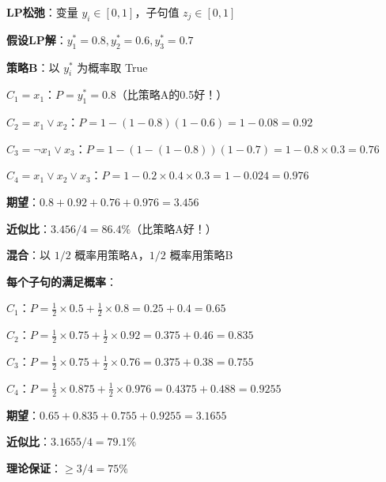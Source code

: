 \documentclass[12pt, a4paper]{ctexart}
\begin{document}
\begin{blackboard}

\textbf{LP松弛}：变量 $y_i \in [0,1]$，子句值 $z_j \in [0,1]$

\textbf{假设LP解}：$y_1^* = 0.8, y_2^* = 0.6, y_3^* = 0.7$

\textbf{策略B}：以 $y_i^*$ 为概率取 True

$C_1 = x_1$：$P = y_1^* = \mathbf{0.8}$（比策略A的0.5好！）

$C_2 = x_1 \lor x_2$：$P = 1 - (1-0.8)(1-0.6) = 1 - 0.08 = \mathbf{0.92}$

$C_3 = \neg x_1 \lor x_3$：$P = 1 - (1-(1-0.8))(1-0.7) = 1 - 0.8 \times 0.3 = \mathbf{0.76}$

$C_4 = x_1 \lor x_2 \lor x_3$：$P = 1 - 0.2 \times 0.4 \times 0.3 = 1 - 0.024 = \mathbf{0.976}$

\textbf{期望}：$0.8 + 0.92 + 0.76 + 0.976 = \mathbf{3.456}$

\textbf{近似比}：$3.456 / 4 = 86.4\%$（比策略A好！）

\end{blackboard}

\begin{blackboard}

\textbf{混合}：以 $1/2$ 概率用策略A，$1/2$ 概率用策略B

\textbf{每个子句的满足概率}：

$C_1$：$P = \frac{1}{2} \times 0.5 + \frac{1}{2} \times 0.8 = 0.25 + 0.4 = \mathbf{0.65}$

$C_2$：$P = \frac{1}{2} \times 0.75 + \frac{1}{2} \times 0.92 = 0.375 + 0.46 = \mathbf{0.835}$

$C_3$：$P = \frac{1}{2} \times 0.75 + \frac{1}{2} \times 0.76 = 0.375 + 0.38 = \mathbf{0.755}$

$C_4$：$P = \frac{1}{2} \times 0.875 + \frac{1}{2} \times 0.976 = 0.4375 + 0.488 = \mathbf{0.9255}$

\textbf{期望}：$0.65 + 0.835 + 0.755 + 0.9255 = \mathbf{3.1655}$

\textbf{近似比}：$3.1655 / 4 = 79.1\%$

\textbf{理论保证}：$\geq 3/4 = 75\%$ \checkmark

\end{blackboard}
\end{document}
